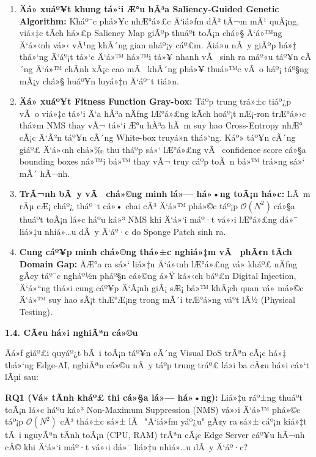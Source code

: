 \documentclass[]{article}
\begin{document}
\begin{enumerate}
\def\labelenumi{\arabic{enumi}.}
\item
  \textbf{Äá» xuáº¥t khung tá»‘i Æ°u hÃ³a Saliency-Guided Genetic Algorithm:}
  Kháº¯c phá»¥c nhÆ°á»£c Ä‘iá»ƒm dÃ² tÃ¬m mÃ¹ quÃ¡ng, viá»‡c tÃ­ch há»£p Saliency Map giÃºp
  thuáº­t toÃ¡n chá»§ Ä‘á»™ng Ä‘á»‹nh vá»‹ vÃ¹ng khÃ´ng gian nháº¡y cáº£m. Äiá»u nÃ y giÃºp há»‡
  thá»‘ng Ä‘áº¡t tá»‘c Ä‘á»™ há»™i tá»¥ nhanh vÃ  sinh ra máº«u táº¥n cÃ´ng Ä‘á»™ chÃ­nh xÃ¡c cao
  mÃ  khÃ´ng phá»¥ thuá»™c vÃ o háº¡ táº§ng mÃ¡y chá»§ huáº¥n luyá»‡n Ä‘áº¯t tiá»n.
\item
  \textbf{Äá» xuáº¥t Fitness Function Gray-box:} Táº­p trung trá»±c tiáº¿p vÃ o 
  viá»‡c tá»‘i Ä‘a hÃ³a nÄƒng lÆ°á»£ng kÃ­ch hoáº¡t nÆ¡-ron trÆ°á»›c thá»m NMS thay vÃ¬ tá»‘i 
  Æ°u hÃ³a hÃ m suy hao Cross-Entropy nhÆ° cÃ¡c Ä‘Ã²n táº¥n cÃ´ng White-box truyá»n 
  thá»‘ng. Káº» táº¥n cÃ´ng giáº£ Ä‘á»‹nh chá»‰ thu tháº­p sá»‘ lÆ°á»£ng vÃ  confidence score 
  cá»§a bounding boxes ná»™i bá»™ thay vÃ¬ truy cáº­p toÃ n bá»™ trá»ng sá»‘ mÃ´ hÃ¬nh.
\item
  \textbf{TrÃ¬nh bÃ y vÃ  chá»©ng minh lá»— há»•ng toÃ¡n há»c:} LÃ m rÃµ cÆ¡ cháº¿ tháº¯t
  cá»• chai cÃ³ Ä‘á»™ phá»©c táº¡p \(\mathcal{O}\left( N^{2} \right)\ \)cá»§a thuáº­t
  toÃ¡n lá»c háº­u ká»³ NMS khi Ä‘á»‘i máº·t vá»›i lÆ°á»£ng dá»¯ liá»‡u nhiá»…u dÃ y Ä‘áº·c do
  Sponge Patch sinh ra.
\item
  \textbf{Cung cáº¥p minh chá»©ng thá»±c nghiá»‡m vÃ  phÃ¢n tÃ­ch Domain Gap:} ÄÆ°a
  ra sá»‘ liá»‡u Ä‘á»‹nh lÆ°á»£ng vá» kháº£ nÄƒng gÃ¢y táº¯c ngháº½n pháº§n cá»©ng á»Ÿ ká»‹ch báº£n
  Digital Injection, Ä‘á»“ng thá»i cung cáº¥p Ä‘Ã¡nh giÃ¡ sÆ¡ bá»™ khÃ¡ch quan vá» má»©c
  Ä‘á»™ suy hao sÃ¡t thÆ°Æ¡ng trong mÃ´i trÆ°á»ng váº­t lÃ½ (Physical Testing).
\end{enumerate}

\textbf{1.4. CÃ¢u há»i nghiÃªn cá»©u}

Äá»ƒ giáº£i quyáº¿t bÃ i toÃ¡n táº¥n cÃ´ng Visual DoS trÃªn cÃ¡c há»‡ thá»‘ng Edge-AI, 
nghiÃªn cá»©u nÃ y táº­p trung tráº£ lá»i ba cÃ¢u há»i cá»‘t lÃµi sau:

\textbf{RQ1 (Vá» tÃ­nh kháº£ thi cá»§a lá»— há»•ng):} Liá»‡u ráº±ng thuáº­t toÃ¡n lá»c háº­u
ká»³ Non-Maximum Suppression (NMS) vá»›i Ä‘á»™ phá»©c táº¡p
\(\mathcal{O}\left( N^{2} \right)\) cÃ³ thá»±c sá»± lÃ  "Ä‘iá»ƒm yáº¿u" gÃ¢y ra sá»±
cáº¡n kiá»‡t tÃ i nguyÃªn tÃ­nh toÃ¡n (CPU, RAM) trÃªn cÃ¡c Edge Server cáº¥u hÃ¬nh
cÅ© khi Ä‘á»‘i máº·t vá»›i dá»¯ liá»‡u nhiá»…u dÃ y Ä‘áº·c?
\end{document}
